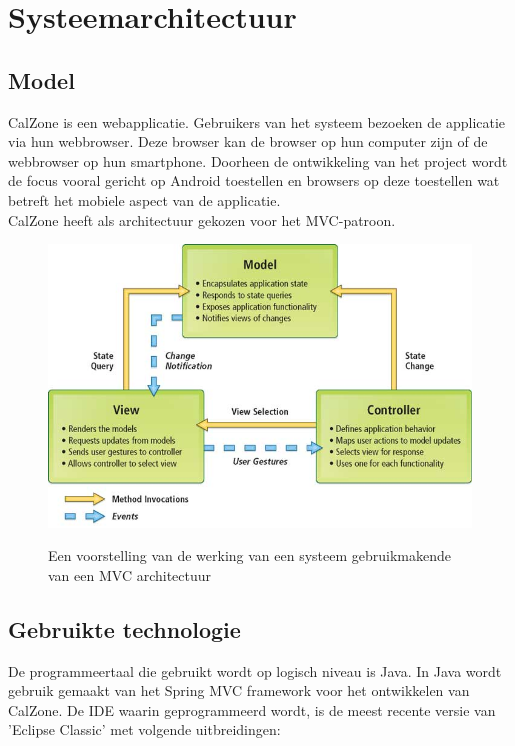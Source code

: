 \chapter{Systeemarchitectuur}
\label{chap:architectuur}

\section{Model}
\label{sec:model}
CalZone is een webapplicatie. Gebruikers van het systeem bezoeken de applicatie via hun webbrowser. 
Deze browser kan de browser op hun computer zijn of de webbrowser op hun smartphone.
Doorheen de ontwikkeling van het project wordt de focus vooral gericht op Android toestellen en browsers op deze toestellen wat betreft het mobiele aspect van de applicatie.
\\
CalZone heeft als architectuur gekozen voor het MVC-patroon.\cite{mvc}

\begin{figure}[H]
	\centering
	\includegraphics[scale=0.5]{img/mvc}
	\label{fig:mvc}
	\caption{Een voorstelling van de werking van een systeem gebruikmakende van een MVC architectuur}
\end{figure}

\section{Gebruikte technologie}
\label{sec:technologie}
De programmeertaal die gebruikt wordt op logisch niveau is Java. 
In Java wordt gebruik gemaakt van het Spring MVC framework\cite{spring, spring-mvc} voor het ontwikkelen van CalZone. 
De IDE waarin geprogrammeerd wordt, is de meest recente versie van 'Eclipse Classic' met volgende uitbreidingen:

